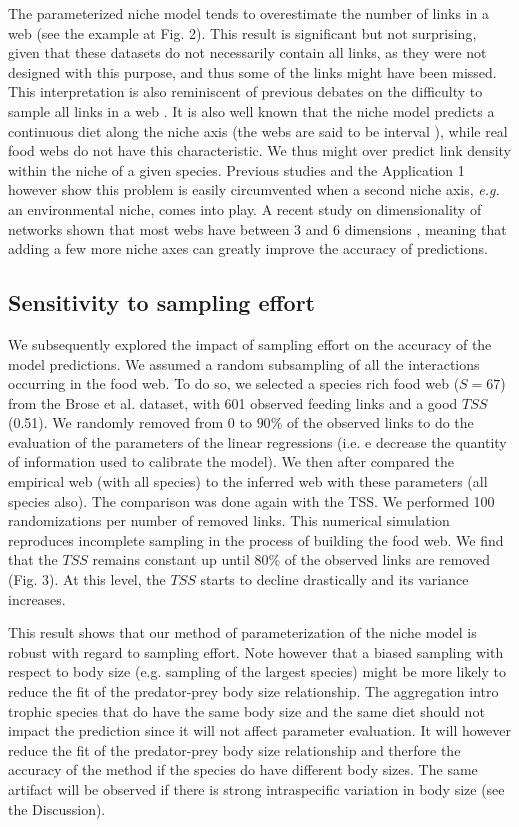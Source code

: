 \documentclass[12pt]{article}
\begin{document}
The parameterized niche model tends to overestimate the number of links in a web
(see the example at Fig. 2). This result is significant but not surprising,
given that these datasets do not necessarily contain all links, as they were not
designed with this purpose, and thus some of the links might have been missed.
This interpretation is also reminiscent of previous debates on the difficulty to
sample all links in a web \parencite{Martinez1999}. It is also well known that
the niche model predicts a continuous diet along the niche axis (the webs are
said to be interval \parencite{Cohen1990, Stouffer2006}), while real food webs
do not have this characteristic. We thus might over predict link density within
the niche of a given species. Previous studies \parencite{Allesina2008} and the
Application 1 however show this problem is easily circumvented when a second
niche axis, \emph{e.g.} an environmental niche, comes into play. A recent study
on dimensionality of networks shown that most webs have between 3 and 6
dimensions \parencite{Eklof2013}, meaning that adding a few more niche axes can
greatly improve the accuracy of predictions.

\subsection{Sensitivity to sampling effort}
We subsequently explored the impact of sampling effort on the accuracy of the
model predictions. We assumed a random subsampling of all the interactions
occurring in the food web. To do so, we selected a species rich food web ($S =
67$) from the Brose et al. dataset, with 601 observed feeding links and a good
$TSS$ (0.51). We randomly removed from 0 to $90\%$ of the observed links to do
the evaluation of the parameters of the linear regressions (i.e. e decrease the
quantity of information used to calibrate the model). We then after compared the
empirical web (with all species) to the inferred web with these parameters (all
species also). The comparison was done again with the TSS. We performed 100
randomizations per number of removed links. This numerical simulation reproduces
incomplete sampling in the process of building the food web. We find that the
$TSS$ remains constant up until $80\%$ of the observed links are removed (Fig.
3). At this level, the $TSS$ starts to decline drastically and its variance
increases.

This result shows that our method of parameterization of the niche model is
robust with regard to sampling effort. Note however that a biased sampling with
respect to body size (e.g. sampling of the largest species) might be more likely
to reduce the fit of the predator-prey body size relationship. The aggregation
intro trophic species that do have the same body size and the same diet should
not impact the prediction since it will not affect parameter evaluation. It will
however reduce the fit of the predator-prey body size relationship and therfore
the accuracy of the method if the species do have different body sizes. The same
artifact will be observed if there is strong intraspecific variation in body
size (see the Discussion).
\end{document}
